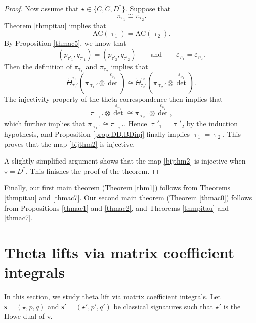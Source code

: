 \documentclass[12pt,a4paper]{amsart}
\numberwithin{equation}{section}
\theoremstyle{remark}
\begin{document}
\begin{proof}
Now assume that $\star\in \{C,\widetilde C, D^*\}$. Suppose that
\[
  \pi_{\uptau_1}\cong \pi_{\uptau_2}.
\]
Theorem \ref{thmpitau} implies that
\[
\mathrm{AC}(\uptau_1)=\mathrm{AC}(\uptau_2).
\]
By Proposition \ref{thmac5}, we know that
\[
 ( p_{\tau'_1}, q_{\tau'_1})=( p_{\tau'_2}, q_{\tau'_2})\qquad\textrm{and}\qquad \varepsilon_{\wp_1}=\varepsilon_{\wp_2}.
\]
Then the definition of $ \pi_{\uptau_1}$ and $ \pi_{\uptau_2}$ implies that
\[
  \check \Theta_{\tau_1'}^{\tau_1}(\pi_{\uptau_1'}\otimes {\det}^{\varepsilon_{\wp_1}})\cong \check \Theta_{\tau_2'}^{\tau_2}(\pi_{\uptau_2'}\otimes {\det}^{\varepsilon_{\wp_1}}).
\]
The injectivity property of the theta correspondence then implies that
\[
\pi_{\uptau_1'}\otimes {\det}^{\varepsilon_{\wp_1}}\cong \pi_{\uptau_2'}\otimes {\det}^{\varepsilon_{\wp_2}},
\]
which further implies that $\pi_{\uptau_1'}\cong \pi_{\uptau_2'}$.
Hence $\uptau'_1=\uptau'_2$ by the induction hypothesis, and Proposition \ref{prop:DD.BDinj} finally implies $\uptau_1=\uptau_2$. This proves that the map \eqref{bijthm2} is injective.

A slightly simplified argument shows that the map \eqref{bijthm2} is injective when $\star=D^*$. This finishes the proof of the theorem.



\end{proof}

Finally, our first main theorem (Theorem \ref{thm1}) follows from Theorems \ref{thmpitau} and \ref{thmac7}. Our second main theorem (Theorem \ref{thmac0}) follows from Propositions \ref{thmac1} and \ref{thmac2}, and Theorems \ref{thmpitau} and \ref{thmac7}.



\section{Theta lifts via matrix coefficient integrals}\label{sec:Integrals}%

In this section, 
we  study theta lift via
matrix coefficient integrals. Let $\mathsf s=(\star, p,q)$ and $ \mathsf s'=(\star', p',q')$ be classical signatures such that $\star'$ is the Howe dual of $\star$.
\end{document}

